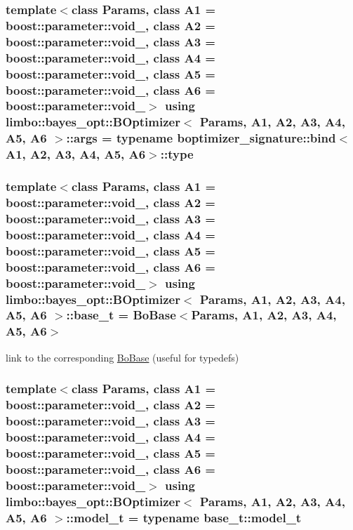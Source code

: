 \subsubsection[{args}]{\setlength{\rightskip}{0pt plus 5cm}template$<$class Params, class A1 = boost\+::parameter\+::void\+\_\+, class A2 = boost\+::parameter\+::void\+\_\+, class A3 = boost\+::parameter\+::void\+\_\+, class A4 = boost\+::parameter\+::void\+\_\+, class A5 = boost\+::parameter\+::void\+\_\+, class A6 = boost\+::parameter\+::void\+\_\+$>$ using {\bf limbo\+::bayes\+\_\+opt\+::\+B\+Optimizer}$<$ Params, A1, A2, A3, A4, A5, A6 $>$\+::{\bf args} =  typename boptimizer\+\_\+signature\+::bind$<$A1, A2, A3, A4, A5, A6$>$\+::type}\label{classlimbo_1_1bayes__opt_1_1_b_optimizer_a52ac13dea70e065c44b51a7ee7fef503}
\hypertarget{classlimbo_1_1bayes__opt_1_1_b_optimizer_a85523f927879dc96892358bb27347523}{}
\subsubsection[{base\+\_\+t}]{\setlength{\rightskip}{0pt plus 5cm}template$<$class Params, class A1 = boost\+::parameter\+::void\+\_\+, class A2 = boost\+::parameter\+::void\+\_\+, class A3 = boost\+::parameter\+::void\+\_\+, class A4 = boost\+::parameter\+::void\+\_\+, class A5 = boost\+::parameter\+::void\+\_\+, class A6 = boost\+::parameter\+::void\+\_\+$>$ using {\bf limbo\+::bayes\+\_\+opt\+::\+B\+Optimizer}$<$ Params, A1, A2, A3, A4, A5, A6 $>$\+::{\bf base\+\_\+t} =  {\bf Bo\+Base}$<$Params, A1, A2, A3, A4, A5, A6$>$}\label{classlimbo_1_1bayes__opt_1_1_b_optimizer_a85523f927879dc96892358bb27347523}


link to the corresponding \hyperlink{classlimbo_1_1bayes__opt_1_1_bo_base}{Bo\+Base} (useful for typedefs) 

\hypertarget{classlimbo_1_1bayes__opt_1_1_b_optimizer_af429e74c89915450c03f563e093766ea}{}
\subsubsection[{model\+\_\+t}]{\setlength{\rightskip}{0pt plus 5cm}template$<$class Params, class A1 = boost\+::parameter\+::void\+\_\+, class A2 = boost\+::parameter\+::void\+\_\+, class A3 = boost\+::parameter\+::void\+\_\+, class A4 = boost\+::parameter\+::void\+\_\+, class A5 = boost\+::parameter\+::void\+\_\+, class A6 = boost\+::parameter\+::void\+\_\+$>$ using {\bf limbo\+::bayes\+\_\+opt\+::\+B\+Optimizer}$<$ Params, A1, A2, A3, A4, A5, A6 $>$\+::{\bf model\+\_\+t} =  typename {\bf base\+\_\+t\+::model\+\_\+t}}\label{classlimbo_1_1bayes__opt_1_1_b_optimizer_af429e74c89915450c03f563e093766ea}


